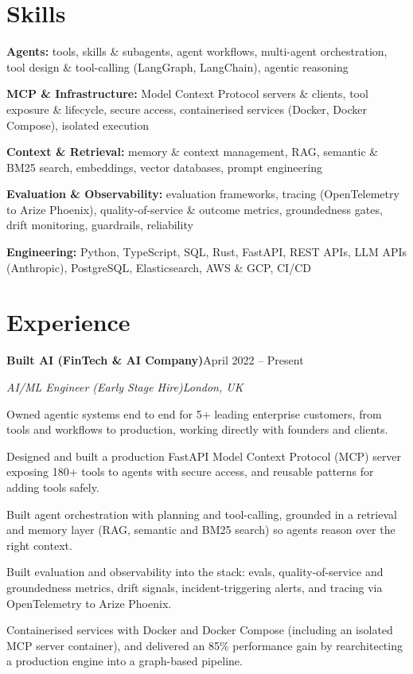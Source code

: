 \documentclass[10pt,a4paper]{article}
\newcommand{\entry}[4]{%
  {\color{company}\bfseries #1}\hfill {\color{muted}#2}\par
  \vspace{1pt}
  {\itshape #3}\hfill {\color{muted}\itshape #4}\par
  \vspace{3pt}%
}
\begin{document}
\section{Skills}
\begin{tight}
  \item[\textcolor{accent}{\small$\bullet$}] \textbf{Agents:} tools, skills \& subagents, agent workflows, multi-agent orchestration, tool design \& tool-calling (LangGraph, LangChain), agentic reasoning
  \item[\textcolor{accent}{\small$\bullet$}] \textbf{MCP \& Infrastructure:} Model Context Protocol servers \& clients, tool exposure \& lifecycle, secure access, containerised services (Docker, Docker Compose), isolated execution
  \item[\textcolor{accent}{\small$\bullet$}] \textbf{Context \& Retrieval:} memory \& context management, RAG, semantic \& BM25 search, embeddings, vector databases, prompt engineering
  \item[\textcolor{accent}{\small$\bullet$}] \textbf{Evaluation \& Observability:} evaluation frameworks, tracing (OpenTelemetry to Arize Phoenix), quality-of-service \& outcome metrics, groundedness gates, drift monitoring, guardrails, reliability
  \item[\textcolor{accent}{\small$\bullet$}] \textbf{Engineering:} Python, TypeScript, SQL, Rust, FastAPI, REST APIs, LLM APIs (Anthropic), PostgreSQL, Elasticsearch, AWS \& GCP, CI/CD
\end{tight}

\section{Experience}
\entry{Built AI (FinTech \& AI Company)}{April 2022 -- Present}{AI/ML Engineer (Early Stage Hire)}{London, UK}
\begin{tight}
  \item Owned agentic systems end to end for 5+ leading enterprise customers, from tools and workflows to production, working directly with founders and clients.
  \item Designed and built a production FastAPI Model Context Protocol (MCP) server exposing 180+ tools to agents with secure access, and reusable patterns for adding tools safely.
  \item Built agent orchestration with planning and tool-calling, grounded in a retrieval and memory layer (RAG, semantic and BM25 search) so agents reason over the right context.
  \item Built evaluation and observability into the stack: evals, quality-of-service and groundedness metrics, drift signals, incident-triggering alerts, and tracing via OpenTelemetry to Arize Phoenix.
  \item Containerised services with Docker and Docker Compose (including an isolated MCP server container), and delivered an 85\% performance gain by rearchitecting a production engine into a graph-based pipeline.
\end{tight}
\end{document}

